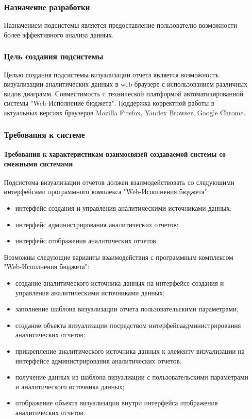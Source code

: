 \documentclass[a4paper]{extarticle}
\numberwithin{equation}{section}
\begin{document}
\subsubsection{Назначение разработки}
Назначением подсистемы является предоставление пользователю возможности более эффективного анализа данных.

\subsubsection{Цель создания подсистемы}
Целью создания подсистемы визуализации отчета является возможность визуализации аналитических данных в web-браузере с использованием различных видов диаграмм. Совместимость с технической платформой автоматизированной системы "Web-Исполнение бюджета". Поддержка корректной работы в актуальных версиях браузеров Mozilla Firefox, Yandex Browser, Google Chrome.

\subsubsection{Требования к системе}

\paragraph{Требования к характеристикам взаимосвязей создаваемой системы со смежными системами}
Подсистема визуализации отчетов должен взаимодействовать со следующими интерфейсами программного комплекса "Web-Исполнения бюджета":\par
\begin{itemize}
  \item интерфейс создания и управления аналитическими источниками данных;
  \item интерфейс администрирования аналитических отчетов;
  \item интерфейс отображения аналитических отчетов.
\end{itemize}\par
Возможны следующие варианты взаимодействия с программным комплексом "Web-Исполнения бюджета":
\begin{itemize}
  \item создание аналитического источника данных на интерфейсе создания и управления аналитическими источниками данных;
  \item заполнение шаблона визуализации отчета пользовательскими параметрами;
  \item создание объекта визуализации посредством интерфейса\newline администрирования аналитических отчетов;
  \item прикрепление аналитического источника данных к элементу визуализации на интерфейсе администрирования аналитических отчетов;
  \item получение данных из шаблона визуалиации с пользовательскими параметрами и аналитического источника данных;
  \item отображение объекта визуализации внутри интерфейса отображения аналитических отчетов.
\end{itemize}
\end{document}
